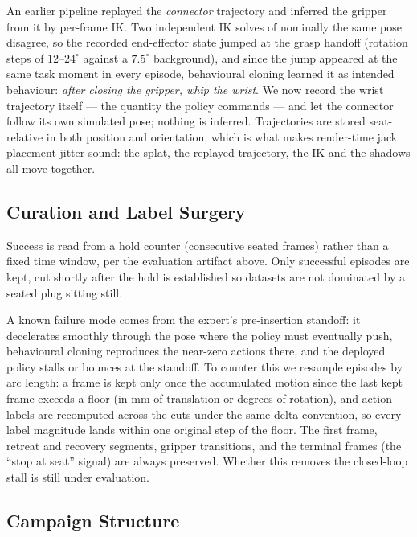 An earlier pipeline replayed the \emph{connector} trajectory and
inferred the gripper from it by per-frame IK. Two independent IK
solves of nominally the same pose disagree, so the recorded
end-effector state jumped at the grasp handoff (rotation steps of
$12$--$24^{\circ}$ against a $7.5^{\circ}$ background), and since
the jump appeared at the same task moment in every episode,
behavioural cloning learned it as intended behaviour: \emph{after
closing the gripper, whip the wrist}. We now record the wrist
trajectory itself --- the quantity the policy commands --- and let
the connector follow its own simulated pose; nothing is inferred.
Trajectories are stored seat-relative in both position and
orientation, which is what makes render-time jack placement jitter
sound: the splat, the replayed trajectory, the IK and the shadows
all move together.

\subsection{Curation and Label Surgery}

Success is read from a hold counter (consecutive seated frames)
rather than a fixed time window, per the evaluation artifact above.
Only successful episodes are kept, cut shortly after the hold is
established so datasets are not dominated by a seated plug sitting
still.

A known failure mode comes from the expert's pre-insertion
standoff: it decelerates smoothly through the pose where the policy
must eventually push, behavioural cloning reproduces the near-zero
actions there, and the deployed policy stalls or bounces at the
standoff. To counter this we resample episodes by arc length: a
frame is kept only once the accumulated motion since the last kept
frame exceeds a floor (in mm of translation or degrees of
rotation), and action labels are recomputed across the cuts under
the same delta convention, so every label magnitude lands within
one original step of the floor. The first frame, retreat and
recovery segments, gripper transitions, and the terminal frames
(the ``stop at seat'' signal) are always preserved. Whether this
removes the closed-loop stall is still under evaluation.

\subsection{Campaign Structure}

